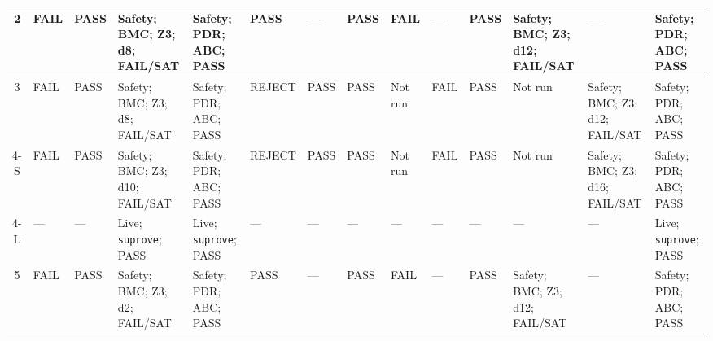 \documentclass[conference]{IEEEtran}
\begin{document}
{\begin{minipage}{0.84\textheight}
\begin{tabularx}{\linewidth}{c *{13}{>{\raggedright\arraybackslash}X}}
2 & FAIL & PASS &
Safety; BMC; Z3; d8; FAIL/SAT &
Safety; PDR; ABC; PASS &
PASS & --- & PASS &
FAIL & --- & PASS &
Safety; BMC; Z3; d12; FAIL/SAT & --- &
Safety; PDR; ABC; PASS \\
\hline

3 & FAIL & PASS &
Safety; BMC; Z3; d8; FAIL/SAT &
Safety; PDR; ABC; PASS &
REJECT & PASS & PASS &
Not run & FAIL & PASS &
Not run & Safety; BMC; Z3; d12; FAIL/SAT &
Safety; PDR; ABC; PASS \\
\hline

4-S & FAIL & PASS &
Safety; BMC; Z3; d10; FAIL/SAT &
Safety; PDR; ABC; PASS &
REJECT & PASS & PASS &
Not run & FAIL & PASS &
Not run & Safety; BMC; Z3; d16; FAIL/SAT &
Safety; PDR; ABC; PASS \\
\hline

4-L & --- & --- &
Live; \texttt{suprove}; PASS &
Live; \texttt{suprove}; PASS &
--- & --- & --- & --- & --- & --- &
--- & --- & Live; \texttt{suprove}; PASS \\
\hline

5 & FAIL & PASS &
Safety; BMC; Z3; d2; FAIL/SAT &
Safety; PDR; ABC; PASS &
PASS & --- & PASS &
FAIL & --- & PASS &
Safety; BMC; Z3; d12; FAIL/SAT & --- &
Safety; PDR; ABC; PASS \\
\hline
\end{tabularx}
\end{minipage}}
\par
\endgroup
\end{document}
